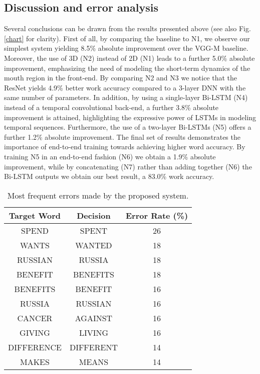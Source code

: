 \documentclass[a4paper]{article}
\begin{document}
\subsection{Discussion and error analysis}
Several conclusions can be drawn from the results presented above (see also Fig. \ref{chart} for clarity). First of all, by comparing the baseline to N1, we observe our simplest system yielding 8.5\% absolute improvement over the VGG-M baseline. Moreover, the use of 3D (N2) instead of 2D (N1) leads to a further 5.0\% absolute improvement, emphasizing the need of modeling the short-term dynamics of the mouth region in the front-end. By comparing N2 and N3 we notice that the ResNet yields 4.9\% better work accuracy compared to a 3-layer DNN with the same number of parameters. In addition, by using a single-layer Bi-LSTM (N4) instead of a temporal convolutional back-end, a further 3.8\% absolute improvement is attained, highlighting the expressive power of LSTMs in modeling temporal sequences. Furthermore, the use of a two-layer Bi-LSTMs (N5) offers a further 1.2\% absolute improvement. The final set of results demonstrates the importance of end-to-end training towards achieving higher word accuracy. By training N5 in an end-to-end fashion (N6) we obtain a 1.9\% absolute improvement, while by concatenating (N7) rather than adding together (N6) the Bi-LSTM outputs we obtain our best result, a 83.0\% work accuracy. 

\begin{table}[!htbp]
\centering
\begin{tabular}{| c | c || c |}
\hline
Target Word & Decision & Error Rate (\%) \\ 
\hline\hline
SPEND & SPENT & 26 \\	
\hline
WANTS & WANTED & 18 \\	
\hline
RUSSIAN & RUSSIA & 18 \\
\hline
BENEFIT & BENEFITS & 18 \\	
\hline
BENEFITS & BENEFIT & 16 \\	
\hline
RUSSIA & RUSSIAN & 16 \\	
\hline
CANCER & AGAINST & 16 \\	
\hline
GIVING & LIVING & 16 \\	
\hline
DIFFERENCE & DIFFERENT & 14	\\
\hline
MAKES & MEANS &14	\\
\hline
\end{tabular}
\vspace{1mm}\caption{Most frequent errors made by the proposed system.} \label{EA1}
\end{table}
\end{document}
